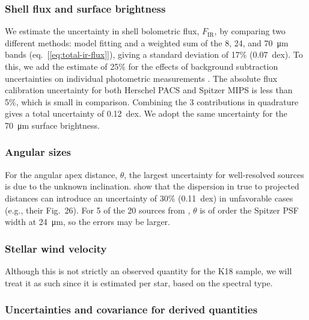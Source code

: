 \subsubsection{Shell flux and surface brightness}
\label{sec:shell-flux-surface}

We estimate the uncertainty in shell bolometric flux,
\(F_{\text{IR}}\), by comparing two different methods: model fitting
\citep{Kobulnicky:2017a} and a weighted sum of the 8, 24, and
\SI{70}{\um} bands (eq.~[\ref{eq:total-ir-flux}]), giving a standard
deviation of 17\% (0.07~dex).  To this, we add the estimate of 25\%
for the effects of background subtraction uncertainties on individual
photometric measurements \citep{Kobulnicky:2017a}. The absolute flux
calibration uncertainty for both Herschel PACS \citep{Balog:2014a} and
Spitzer MIPS \citep{Engelbracht:2007a} is less than 5\%, which is
small in comparison. Combining the 3 contributions in quadrature gives
a total uncertainty of 0.12~dex.  We adopt the same uncertainty for
the \SI{70}{\um} surface brightness.

\subsubsection{Angular sizes}
\label{sec:angular-sizes}

For the angular apex distance, \(\theta\), the largest uncertainty for
well-resolved sources is due to the unknown inclination.
\citet{Tarango-Yong:2018a} show that the dispersion in true to
projected distances can introduce an uncertainty of \(30\%\)
(0.11~dex) in unfavorable cases (e.g., their Fig.~26).  For 5 of the
20 sources from \citet{Kobulnicky:2018a}, \(\theta\) is of order the
Spitzer PSF width at \SI{24}{\um}, so the errors may be larger.

\subsubsection{Stellar wind velocity}
\label{sec:stell-wind-veloc}

Although this is not strictly an observed quantity for the K18 sample,
we will treat it as such since it is estimated per star, based on the
spectral type.

\subsubsection{Uncertainties and covariance for derived quantities}
\label{sec:comb-uncert-covar}

